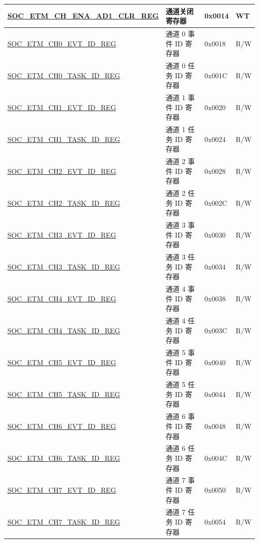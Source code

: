 \begin{longtable}{ | p{6cm} | p{6.2cm} | p{1.3cm} | p{2cm} | }
\hyperref[regdesc:SOCETMCHENAAD1CLRREG]{SOC\_ETM\_CH\_ENA\_AD1\_CLR\_REG} & 通道关闭寄存器 & 0x0014 & WT \\ \hline
\hyperref[regdesc:SOCETMCHNEVTIDREG]{SOC\_ETM\_CH0\_EVT\_ID\_REG} & 通道 0 事件 ID 寄存器 & 0x0018 & R/W \\ \hline
\hyperref[regdesc:SOCETMCHNTASKIDREG]{SOC\_ETM\_CH0\_TASK\_ID\_REG} & 通道 0 任务 ID 寄存器 & 0x001C & R/W \\ \hline
\hyperref[regdesc:SOCETMCHNEVTIDREG]{SOC\_ETM\_CH1\_EVT\_ID\_REG} & 通道 1 事件 ID 寄存器 & 0x0020 & R/W \\ \hline
\hyperref[regdesc:SOCETMCHNTASKIDREG]{SOC\_ETM\_CH1\_TASK\_ID\_REG} & 通道 1 任务 ID 寄存器 & 0x0024 & R/W \\ \hline
\hyperref[regdesc:SOCETMCHNEVTIDREG]{SOC\_ETM\_CH2\_EVT\_ID\_REG} & 通道 2 事件 ID 寄存器 & 0x0028 & R/W \\ \hline
\hyperref[regdesc:SOCETMCHNTASKIDREG]{SOC\_ETM\_CH2\_TASK\_ID\_REG} & 通道 2 任务 ID 寄存器 & 0x002C & R/W \\ \hline
\hyperref[regdesc:SOCETMCHNEVTIDREG]{SOC\_ETM\_CH3\_EVT\_ID\_REG} & 通道 3 事件 ID 寄存器 & 0x0030 & R/W \\ \hline
\hyperref[regdesc:SOCETMCHNTASKIDREG]{SOC\_ETM\_CH3\_TASK\_ID\_REG} & 通道 3 任务 ID 寄存器 & 0x0034 & R/W \\ \hline
\hyperref[regdesc:SOCETMCHNEVTIDREG]{SOC\_ETM\_CH4\_EVT\_ID\_REG} & 通道 4 事件 ID 寄存器 & 0x0038 & R/W \\ \hline
\hyperref[regdesc:SOCETMCHNTASKIDREG]{SOC\_ETM\_CH4\_TASK\_ID\_REG} & 通道 4 任务 ID 寄存器 & 0x003C & R/W \\ \hline
\hyperref[regdesc:SOCETMCHNEVTIDREG]{SOC\_ETM\_CH5\_EVT\_ID\_REG} & 通道 5 事件 ID 寄存器 & 0x0040 & R/W \\ \hline
\hyperref[regdesc:SOCETMCHNTASKIDREG]{SOC\_ETM\_CH5\_TASK\_ID\_REG} & 通道 5 任务 ID 寄存器 & 0x0044 & R/W \\ \hline
\hyperref[regdesc:SOCETMCHNEVTIDREG]{SOC\_ETM\_CH6\_EVT\_ID\_REG} & 通道 6 事件 ID 寄存器 & 0x0048 & R/W \\ \hline
\hyperref[regdesc:SOCETMCHNTASKIDREG]{SOC\_ETM\_CH6\_TASK\_ID\_REG} & 通道 6 任务 ID 寄存器 & 0x004C & R/W \\ \hline
\hyperref[regdesc:SOCETMCHNEVTIDREG]{SOC\_ETM\_CH7\_EVT\_ID\_REG} & 通道 7 事件 ID 寄存器 & 0x0050 & R/W \\ \hline
\hyperref[regdesc:SOCETMCHNTASKIDREG]{SOC\_ETM\_CH7\_TASK\_ID\_REG} & 通道 7 任务 ID 寄存器 & 0x0054 & R/W \\ \hline

\end{longtable}
